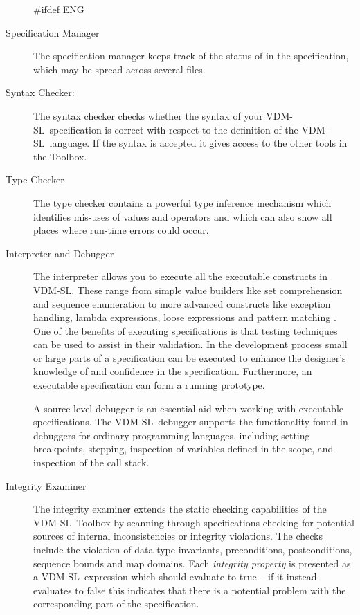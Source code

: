 \documentclass[\pformat,12pt]{article}
\newcommand{\vdmslpp}{VDM-SL}
\newcommand{\Toolbox}{Toolbox}
\newcommand{\vdmslpp}{VDM++}
\newcommand{\Toolbox}{Toolbox}
\begin{document}
\begin{description}
  
#ifdef ENG
\item[Specification Manager] The specification manager keeps track of
  the status of  in the
  specification, which may be spread across several files.
 
\item[Syntax Checker:] The syntax checker checks whether the syntax of
your \vdmslpp\ specification is correct with respect to the definition
of the \vdmslpp\ language. If the syntax is accepted it gives access
to the other tools in the \Toolbox.

\item[Type Checker]
  The type checker contains a powerful type inference mechanism which
  identifies mis-uses of values and operators and which can also show all
  places where run-time errors could occur.

\item[Interpreter and Debugger] The interpreter allows you
  to execute all the executable constructs in \vdmslpp. These range
  from simple value builders like set comprehension and sequence
  enumeration to more advanced constructs like exception handling,
  lambda expressions, loose expressions and pattern matching%
.  One of
  the benefits of executing specifications is that testing techniques
  can be used to assist in their validation. In the development
  process small or large parts of a specification can be executed to
  enhance the designer's knowledge of and confidence in the
  specification. Furthermore, an executable specification can form a
  running prototype.

  A source-level debugger is an essential aid when working
  with executable specifications. The \vdmslpp\ debugger supports the
  functionality found in debuggers for ordinary programming languages,
  including setting breakpoints, stepping, inspection of variables
  defined in the scope, and inspection of the call stack. 

\item[Integrity Examiner] The integrity examiner extends the static
  checking capabilities of the \vdmslpp\ Toolbox by scanning through
  specifications checking for potential sources of internal
  inconsistencies or integrity violations. The checks include the
  violation of data type invariants, preconditions,  postconditions,
  sequence bounds and map domains. Each \emph{integrity property} is 
  presented as a \vdmslpp\ expression which should evaluate to true --
  if it instead evaluates to false this indicates that there is a
  potential problem with the corresponding part of the specification. 


\end{description}
\end{document}
